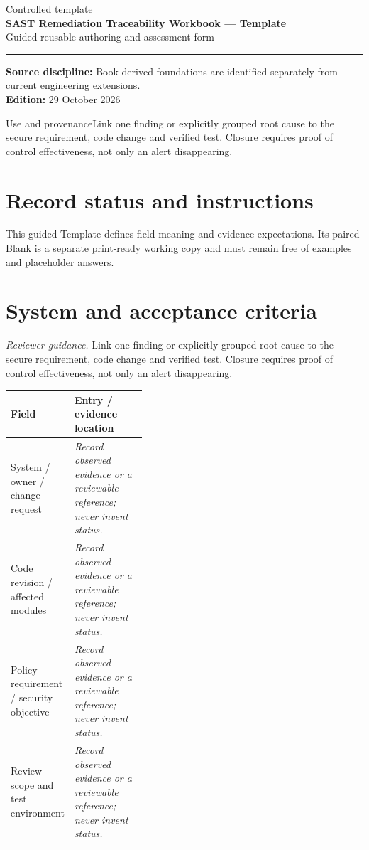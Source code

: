 \documentclass[10pt,letterpaper]{article}
\begin{document}
\hypersetup{pageanchor=false}%
\begin{titlepage}
\vspace*{1.0in}
{\color{bluegray}\Large Controlled template}\\[1.0em]
{\color{navy}\Huge\bfseries SAST Remediation Traceability Workbook --- Template}\\[0.7em]
{\Large Guided reusable authoring and assessment form}\\[2.0em]
\rule{\linewidth}{1.0pt}
\vfill
\textbf{Source discipline:} Book-derived foundations are identified separately from current engineering extensions.\\
\textbf{Edition:} 29 October 2026
\end{titlepage}\hypersetup{pageanchor=true}
\tableofcontents
\clearpage
\begin{focusbox}{Use and provenance}Link one finding or explicitly grouped root cause to the secure requirement, code change and verified test. Closure requires proof of control effectiveness, not only an alert disappearing.\end{focusbox}
\section{Record status and instructions}
This guided Template defines field meaning and evidence expectations. Its paired Blank is a separate print-ready working copy and must remain free of examples and placeholder answers.

\section{System and acceptance criteria}
\textit{Reviewer guidance.} Link one finding or explicitly grouped root cause to the secure requirement, code change and verified test. Closure requires proof of control effectiveness, not only an alert disappearing.
\begin{tabularx}{\linewidth}{@{}p{0.38\linewidth}Y@{}}
\toprule Field & Entry / evidence location\\\midrule
System / owner / change request & \textit{Record observed evidence or a reviewable reference; never invent status.}\\[1.0em]
\midrule
Code revision / affected modules & \textit{Record observed evidence or a reviewable reference; never invent status.}\\[1.0em]
\midrule
Policy requirement / security objective & \textit{Record observed evidence or a reviewable reference; never invent status.}\\[1.0em]
\midrule
Review scope and test environment & \textit{Record observed evidence or a reviewable reference; never invent status.}\\[1.0em]
\midrule
\end{tabularx}
\end{document}
